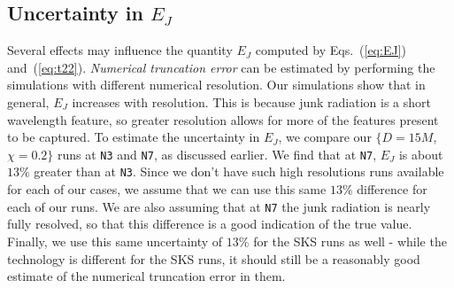 \subsection{Uncertainty in $E_J$}
\label{subsec:ErrorEstimation}


Several effects may influence the quantity $E_J$ computed by
  Eqs.~(\ref{eq:EJ}) and~(\ref{eq:t22}).  {\it Numerical truncation
    error} can be estimated by performing the simulations with
  different numerical resolution.  Our simulations show that in general,
  $E_J$ increases with resolution. This is because junk radiation is
a short wavelength feature, so greater resolution allows for more of
the features present to be captured.  To estimate the
uncertainty in $E_J$, we compare our $\{D=15M$,
$\chi=0.2\}$ runs at {\tt N3} and {\tt N7}, as discussed earlier. We find that
at {\tt N7}, $E_J$ is about $13\%$ greater than at {\tt N3}. Since we don't
have such high resolutions runs available for each of our cases, we
assume that we can use this same $13\%$ difference for each of our
runs. We are also assuming that at {\tt N7} the junk
radiation is nearly fully resolved, so that this difference is a good
indication of the true value. Finally, we use this same uncertainty of
$13\%$ for the SKS runs as well - while the technology is different
for the SKS runs, it should still be a reasonably good estimate of the numerical truncation error in them.


